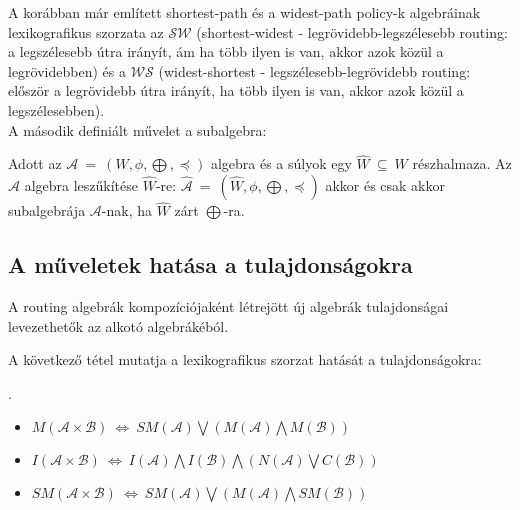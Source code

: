   A korábban már említett shortest-path és a widest-path policy-k algebráinak lexikografikus szorzata az $\mathcal{SW}$ (shortest-widest - legrövidebb-legszélesebb routing: a legszélesebb útra irányít, ám ha több ilyen is van, akkor azok közül a legrövidebben) és a $\mathcal{WS}$ (widest-shortest - legszélesebb-legrövidebb routing: először a legrövidebb útra irányít, ha több ilyen is van, akkor azok közül a legszélesebben).\\

  A második definiált művelet a subalgebra:
  \begin{definition} 
    Adott az $\mathcal{A}~=~(W,\phi,\bigoplus,\preceq)$ algebra és a súlyok egy $\hat{W}~\subseteq~W$ részhalmaza. Az $\mathcal{A}$ algebra leszűkítése $\hat{W}$-re: $\hat{\mathcal{A}}~=~(\hat{W},\phi,\bigoplus,\preceq)$ akkor és csak akkor subalgebrája $\mathcal{A}$-nak, ha $\hat{W}$ zárt $\bigoplus$-ra.
  \end{definition}

    \subsection{A műveletek hatása a tulajdonságokra}\label{section_algebramuveletek_tulajdonsagok}

    A routing algebrák kompozíciójaként létrejött új algebrák tulajdonságai levezethetők az alkotó algebrákéból.

    A következő tétel mutatja a lexikografikus szorzat hatását a tulajdonságokra:
    \begin{theorem}\label{eq:lexi}
      .
      \begin{itemize}
      \item $M(\mathcal{A} \times \mathcal{B})~\Leftrightarrow~ SM(\mathcal{A}) \bigvee (M(\mathcal{A}) \bigwedge M(\mathcal{B}))$
      \item $I(\mathcal{A} \times \mathcal{B})~\Leftrightarrow~ I(\mathcal{A}) \bigwedge I(\mathcal{B}) \bigwedge (N(\mathcal{A}) \bigvee C(\mathcal{B}))$
      \item $SM(\mathcal{A} \times \mathcal{B})~\Leftrightarrow~ SM(\mathcal{A}) \bigvee (M(\mathcal{A}) \bigwedge SM(\mathcal{B}))$\\
      \end{itemize}
    \end{theorem}

